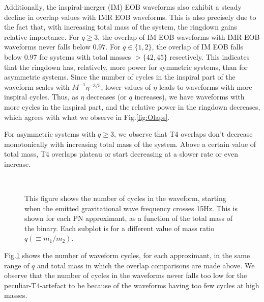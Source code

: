 \documentclass[aps,
prd,
amsmath,
amssymb,
twocolumn,
floatfix,
groupedaddress]{revtex4-1}
\def\l({\left(}
\def\r){\right)}
\begin{document}
Additionally, the inspiral-merger (IM) EOB waveforms also exhibit a steady decline in overlap values with IMR EOB waveforms. This is also precisely due to the fact that, with increasing total mass of the system, the ringdown gains relative importance. For $q\geq 3$, the overlap of IM EOB waveforms with IMR EOB waveforms never falls below $0.97$. For $q\in\{1,2\}$, the overlap of IM EOB falls below $0.97$ for systems with total masses $>\{42,45\}$ resectively. This indicates that the ringdown has, relatively, more power for symmetric systems, than for asymmetric systems. Since the number of cycles in the inspiral part of the waveform scales with $M^{-1}\eta^{-3/5}$, lower values of $\eta$ leads to waveforms with more inspiral cycles. Thus, as $\eta$ decreases (or $q$ increases), we have waveforms with more cycles in the inspiral part, and the relative power in the ringdown decreases, which agrees with what we observe in Fig.\ref{fig:Olaps}.

For asymmetric systems with $q\geq3$, we observe that T4 overlaps don't decrease monotonically with increasing total mass of the system. Above a certain value of total mass, T4 overlaps plateau or start decreasing at a slower rate or even increase. 

\begin{figure}[htbp]
  \begin{center}
  	\mbox{
  }
  	\mbox{
	}
	\mbox{
	}
	\caption{This figure shows the number of cycles in the waveform, starting when the emitted gravitational wave frequency crosses 15Hz. This is shown for each PN approximant, as a function of the total mass of the binary. Each subplot is for a different value of mass ratio $q \l(\equiv m_1/m_2\r)$.}
  \label{fig:NumCycles}
  \end{center}
\end{figure}
Fig.\ref{fig:NumCycles} shows the number of waveform cycles, for each approximant, in the same range of $q$ and total mass in which the overlap comparisons are made above. We observe that the number of cycles in the waveforms never falls too low for the peculiar-T4-artefact to be because of the waveforms having too few cycles at high masses.
\end{document}
